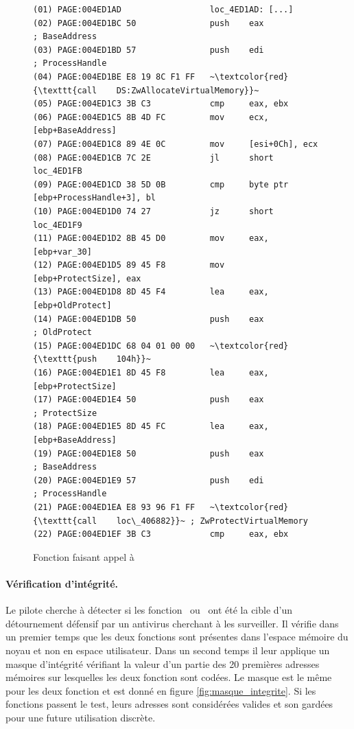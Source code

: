 \begin{figure}
\scriptsize
\begin{lstlisting}[language={[x86masm]Assembler}, escapechar=~]
(01) PAGE:004ED1AD                  loc_4ED1AD: [...]                      
(02) PAGE:004ED1BC 50               push    eax             ; BaseAddress
(03) PAGE:004ED1BD 57               push    edi             ; ProcessHandle
(04) PAGE:004ED1BE E8 19 8C F1 FF   ~\textcolor{red}{\texttt{call    DS:ZwAllocateVirtualMemory}}~
(05) PAGE:004ED1C3 3B C3            cmp     eax, ebx
(06) PAGE:004ED1C5 8B 4D FC         mov     ecx, [ebp+BaseAddress]
(07) PAGE:004ED1C8 89 4E 0C         mov     [esi+0Ch], ecx
(08) PAGE:004ED1CB 7C 2E            jl      short loc_4ED1FB
(09) PAGE:004ED1CD 38 5D 0B         cmp     byte ptr [ebp+ProcessHandle+3], bl
(10) PAGE:004ED1D0 74 27            jz      short loc_4ED1F9
(11) PAGE:004ED1D2 8B 45 D0         mov     eax, [ebp+var_30]
(12) PAGE:004ED1D5 89 45 F8         mov     [ebp+ProtectSize], eax
(13) PAGE:004ED1D8 8D 45 F4         lea     eax, [ebp+OldProtect]
(14) PAGE:004ED1DB 50               push    eax             ; OldProtect
(15) PAGE:004ED1DC 68 04 01 00 00   ~\textcolor{red}{\texttt{push    104h}}~
(16) PAGE:004ED1E1 8D 45 F8         lea     eax, [ebp+ProtectSize]
(17) PAGE:004ED1E4 50               push    eax             ; ProtectSize
(18) PAGE:004ED1E5 8D 45 FC         lea     eax, [ebp+BaseAddress]
(19) PAGE:004ED1E8 50               push    eax             ; BaseAddress
(20) PAGE:004ED1E9 57               push    edi             ; ProcessHandle
(21) PAGE:004ED1EA E8 93 96 F1 FF   ~\textcolor{red}{\texttt{call    loc\_406882}}~ ; ZwProtectVirtualMemory
(22) PAGE:004ED1EF 3B C3            cmp     eax, ebx
\end{lstlisting}
\caption{Fonction faisant appel à \ZwP\label{fig:CallZwProtect}}
\end{figure}

\paragraph{Vérification d'intégrité.}
Le pilote cherche à détecter si les fonction \ZwA\ ou \ZwP\ ont été la cible d'un détournement défensif par un antivirus cherchant à les surveiller.
Il vérifie dans un premier temps que les deux fonctions sont présentes dans l'espace mémoire du noyau et non en espace utilisateur.
Dans un second temps il leur applique un masque d'intégrité vérifiant la valeur d'un partie des 20 premières adresses mémoires sur lesquelles les deux fonction sont codées. Le masque est le même pour les deux fonction et est donné en figure \ref{fig:masque_integrite}.
Si les fonctions passent le test, leurs adresses sont considérées valides et son gardées pour une future utilisation discrète.


